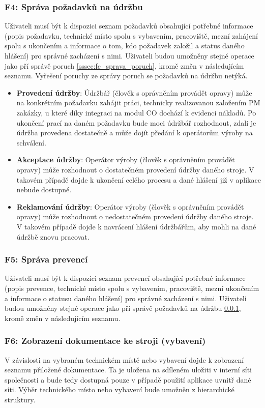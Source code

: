 \documentclass[thesis=M,czech]{FITthesis}[2012/06/26]
\begin{document}
\subsubsection{F4: Správa požadavků na údržbu}
\label{sssec:fc_sprava_poz_udr}
Uživateli musí být k dispozici seznam požadavků obsahující potřebné informace (popis požadavku, technické místo spolu s vybavením, pracoviště, mezní zahájení spolu s ukončením a informace o tom, kdo požadavek založil a status daného hlášení) pro správné zacházení s nimi. Uživateli budou umožněny stejné operace jako pří správě poruch \ref{sssec:fc_sprava_poruch}, kromě změn v následujícím seznamu. Vyřešení poruchy ze správy poruch se požadavků na údržbu netýká.
\begin{itemize}
	\item
	\textbf{Provedení údržby}: Údržbář (člověk s oprávněním provádět opravy) může na konkrétním požadavku zahájit práci, technicky realizovanou založením PM zakázky, u které díky integraci na modul CO dochází k evidenci nákladů. Po ukončení prací na daném požadavku bude moci údržbář rozhodnout, zdali je údržba provedena dostatečně a může dojít předání k operátorům výroby na schválení. 
	\item
	\textbf{Akceptace údržby}: Operátor výroby (člověk s oprávněním provádět opravy) může rozhodnout o dostatečném provedení údržby daného stroje. V takovém případě dojde k ukončení celého procesu a dané hlášení již v aplikace nebude dostupné.
	\item
	\textbf{Reklamování údržby}: Operátor výroby (člověk s oprávněním provádět opravy) může rozhodnout o nedostatečném provedení údržby daného stroje. V takovém případě dojde k navrácení hlášení údržbářům, aby mohli na dané údržbě znovu pracovat.
\end{itemize} 
\subsubsection{F5: Správa prevencí}
\label{sssec:fc_sprava_prev}
Uživateli musí být k dispozici seznam prevencí obsahující potřebné informace (popis prevence, technické místo spolu s vybavením, pracoviště, mezní ukončením a informace o statusu daného hlášení) pro správné zacházení s nimi. Uživateli budou umožněny stejné operace jako pří správě požadavků na údržbu \ref{sssec:fc_sprava_poz_udr}, kromě změn v následujícím seznamu. 
\subsubsection{F6: Zobrazení dokumentace ke stroji (vybavení)}
V závislosti na vybraném technickém místě nebo vybavení dojde k zobrazení seznamu přiložené dokumentace. Ta je uložena na sdíleném uložiti v interní síti společnosti a bude tedy dostupná pouze v případě použití aplikace uvnitř dané síti. Výběr technického místo nebo vybavení bude umožněn z hierarchické struktury.
\end{document}
